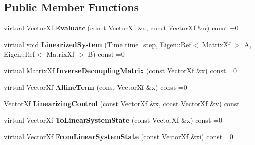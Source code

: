 \subsection*{Public Member Functions}
\begin{DoxyCompactItemize}
\item 
virtual Vector\+Xf {\bfseries Evaluate} (const Vector\+Xf \&x, const Vector\+Xf \&u) const =0\hypertarget{classilqgames_1_1_single_player_flat_system_a20c9491dcf6871772de086a11d30d5d7}{}\label{classilqgames_1_1_single_player_flat_system_a20c9491dcf6871772de086a11d30d5d7}

\item 
virtual void {\bfseries Linearized\+System} (Time time\+\_\+step, Eigen\+::\+Ref$<$ Matrix\+Xf $>$ A, Eigen\+::\+Ref$<$ Matrix\+Xf $>$ B) const =0\hypertarget{classilqgames_1_1_single_player_flat_system_a0971da48d2ca31c59fc2e4d4e64c1394}{}\label{classilqgames_1_1_single_player_flat_system_a0971da48d2ca31c59fc2e4d4e64c1394}

\item 
virtual Matrix\+Xf {\bfseries Inverse\+Decoupling\+Matrix} (const Vector\+Xf \&x) const =0\hypertarget{classilqgames_1_1_single_player_flat_system_a3683c7873c019f02d8bfcaa0de1afa16}{}\label{classilqgames_1_1_single_player_flat_system_a3683c7873c019f02d8bfcaa0de1afa16}

\item 
virtual Vector\+Xf {\bfseries Affine\+Term} (const Vector\+Xf \&x) const =0\hypertarget{classilqgames_1_1_single_player_flat_system_a4ce7b06850b71df461800dccf9683a20}{}\label{classilqgames_1_1_single_player_flat_system_a4ce7b06850b71df461800dccf9683a20}

\item 
Vector\+Xf {\bfseries Linearizing\+Control} (const Vector\+Xf \&x, const Vector\+Xf \&v) const \hypertarget{classilqgames_1_1_single_player_flat_system_a4ca811c59babd68b0fdf9d9ed0298431}{}\label{classilqgames_1_1_single_player_flat_system_a4ca811c59babd68b0fdf9d9ed0298431}

\item 
virtual Vector\+Xf {\bfseries To\+Linear\+System\+State} (const Vector\+Xf \&x) const =0\hypertarget{classilqgames_1_1_single_player_flat_system_a594d67986244e731fb70ded660575020}{}\label{classilqgames_1_1_single_player_flat_system_a594d67986244e731fb70ded660575020}

\item 
virtual Vector\+Xf {\bfseries From\+Linear\+System\+State} (const Vector\+Xf \&xi) const =0\hypertarget{classilqgames_1_1_single_player_flat_system_a235d40a141ea4ae6ce39523aa0187d3e}{}\label{classilqgames_1_1_single_player_flat_system_a235d40a141ea4ae6ce39523aa0187d3e}


\end{DoxyCompactItemize}
